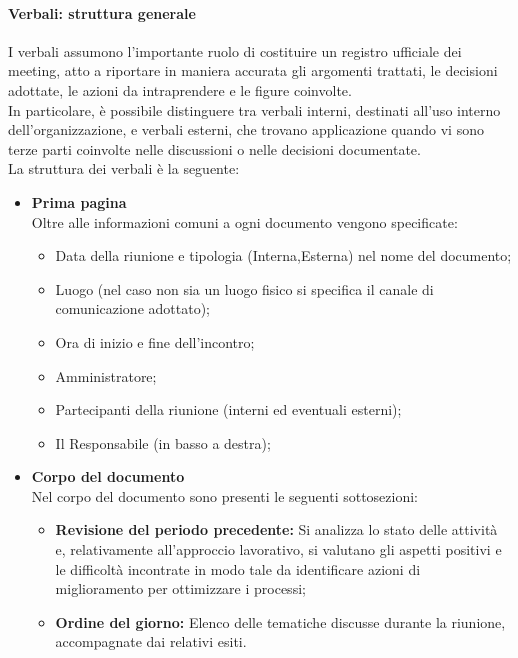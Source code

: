 \paragraph{Verbali: struttura generale}
\label{sec:Verbali}
I verbali assumono l'importante ruolo di costituire un registro ufficiale dei meeting, atto a riportare in maniera accurata gli argomenti trattati, le decisioni adottate, le azioni da intraprendere e le figure coinvolte.\\
In particolare, è possibile distinguere tra verbali interni, destinati all'uso interno dell'organizzazione, e verbali esterni, che trovano applicazione quando vi sono terze parti coinvolte nelle discussioni o nelle decisioni documentate.\\
La struttura dei verbali è la seguente: 
\begin{itemize}
    \item \textbf{Prima pagina} \\
        Oltre alle informazioni comuni a ogni documento vengono specificate:
        \begin{itemize}
            \item Data della riunione e tipologia (Interna,Esterna) nel nome del documento;
            \item Luogo (nel caso non sia un luogo fisico si specifica il canale di comunicazione adottato);
            \item Ora di inizio e fine dell'incontro;
            \item Amministratore;
            \item Partecipanti della riunione (interni ed eventuali esterni);
            \item Il Responsabile (in basso a destra);
        \end{itemize}
    \item \textbf{Corpo del documento} \\
        Nel corpo del documento sono presenti le seguenti sottosezioni:
        \begin{itemize}
            \item \textbf{Revisione del periodo precedente:} Si analizza lo stato delle attività e, relativamente all'approccio lavorativo, si valutano gli aspetti positivi e le difficoltà incontrate in modo tale da identificare azioni di miglioramento per ottimizzare i processi;
            \item \textbf{Ordine del giorno:} Elenco delle tematiche discusse durante la riunione, accompagnate dai relativi esiti. \\
            

\end{itemize}
\end{itemize}
